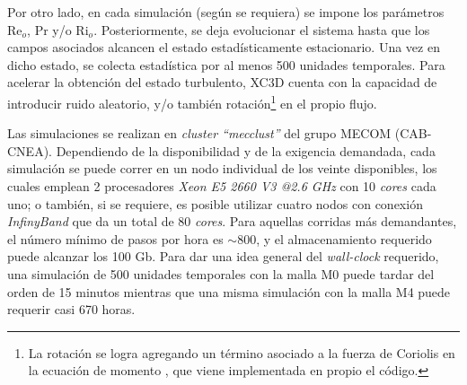 Por otro lado, en cada simulación (según se requiera) se impone los parámetros Re$_o$, Pr y/o Ri$_o$. Posteriormente, se deja evolucionar el sistema hasta que los campos asociados alcancen el estado estadísticamente estacionario. Una vez en dicho estado, se colecta estadística por al menos 500 unidades temporales. Para acelerar la obtención del estado turbulento, XC3D cuenta con la capacidad de introducir  ruido aleatorio, y/o también rotación\footnote{La rotación se logra agregando un término asociado a la fuerza de Coriolis en la ecuación de momento \cite{lamballais2014}, que viene implementada en propio el código.} en el propio flujo. 

Las simulaciones se realizan en \textit{cluster ``mecclust''} del grupo MECOM (CAB-CNEA). Dependiendo de la disponibilidad y de la exigencia demandada, cada simulación se puede correr en un nodo individual de los veinte disponibles, los cuales emplean 2 procesadores \textit{Xeon E5 2660 V3 @2.6 GHz} con 10 \textit{cores} cada uno; o también, si se requiere, es posible utilizar cuatro nodos con conexión \textit{InfinyBand} que da un total de 80 \textit{cores}. Para aquellas corridas más demandantes, el número mínimo de pasos por hora es $\sim 800$, y el almacenamiento requerido puede alcanzar los 100 Gb. Para dar una idea general del \textit{wall-clock} requerido, una simulación de 500 unidades temporales con la malla M0 puede tardar del orden de 15 minutos mientras que una misma simulación con la malla M4 puede requerir casi 670 horas.       


\begin{table}[H]
\centering
{}
\caption{Distintas resoluciones espaciales y temporales utilizadas en las simulaciones de validación.}
\label{tab:meshes}
\end{table}

